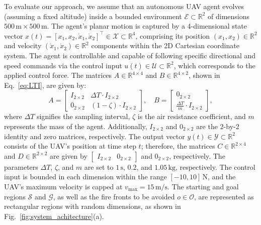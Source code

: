 To evaluate our approach, we assume that an autonomous UAV agent evolves (assuming a fixed altitude) inside a bounded environment \( \mathcal{E} \subset \mathbb{R}^2 \) of dimensions \( 500 \, \text{m} \times 500 \, \text{m} \). The agent's planar motion is captured by a 4-dimensional state vector \( x(t) = [x_1, x_2, \dot{x}_1, \dot{x}_2]^\top \in \mathcal{X} \subset \mathbb{R}^4 \), comprising its position \( (x_1, x_2) \in \mathbb{R}^2 \) and velocity \( (\dot{x}_1, \dot{x}_2) \in \mathbb{R}^2 \) components within the 2D Cartesian coordinate system. The agent is controllable and capable of following specific directional and speed commands via the control input \( u(t) \in \mathcal{U} \subset \mathbb{R}^2 \), which corresponds to the applied control force. The matrices \( A \in \mathbb{R}^{4 \times 4} \) and \( B \in \mathbb{R}^{4 \times 2} \), shown in Eq.~\eqref{eq:LTI}, are given by:
\begin{equation*}
A = 
\begin{bmatrix}
    I_{2 \times 2} & \Delta T \cdot I_{2 \times 2} \\
    0_{2 \times 2} & (1 - \zeta) \cdot I_{2 \times 2}
\end{bmatrix}, \quad B = 
\begin{bmatrix}
    0_{2 \times 2} \\
    \frac{\Delta T}{m} \cdot I_{2 \times 2}
\end{bmatrix},
\end{equation*}
where \( \Delta T \) signifies the sampling interval, \( \zeta \) is the air resistance coefficient, and \( m \) represents the mass of the agent. Additionally, \( I_{2 \times 2} \) and \( 0_{2 \times 2} \) are the 2-by-2 identity and zero matrices, respectively. The output vector \( y(t) \in \mathcal{Y} \subset \mathbb{R}^2 \) consists of the UAV's position at time step \( t \); therefore, the matrices \( C \in \mathbb{R}^{2 \times 4} \) and \( D \in \mathbb{R}^{2 \times 2} \) are given by \( \begin{bmatrix} I_{2 \times 2} & 0_{2 \times 2} \end{bmatrix} \) and \( 0_{2 \times 2} \), respectively. The parameters \( \Delta T \), \( \zeta \), and \( m \) are set to \( 1 \, \text{s} \), \( 0.2 \), and \( 1.05 \, \text{kg} \), respectively. The control input is bounded in each dimension within the range \( [-10, 10] \, \text{N} \), and the UAV's maximum velocity is capped at \( v_{\text{max}} = 15 \, \text{m/s} \). The starting and goal regions \( \mathcal{S} \) and \( \mathcal{G} \), as well as the fire fronts to be avoided \( o \in \mathcal{O} \), are represented as rectangular regions with random dimensions, as shown in Fig.~\ref{fig:system_achitecture}(a).

